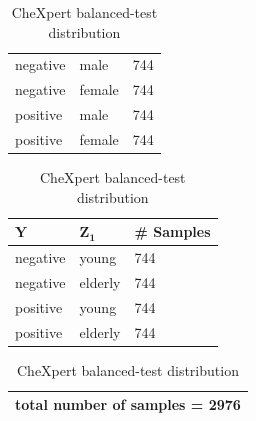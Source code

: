 \documentclass[12pt,DIV14,BCOR12mm,a4paper,footinclude=false,headinclude,parskip=half-,twoside,openright,cleardoublepage=empty,toc=index,bibliography=totoc,listof=totoc]{scrreprt}
\numberwithin{equation}{chapter}
\begin{document}
\begin{table}[H]
\begin{minipage}[H]{\linewidth}
\begin{minipage}[H]{0.5\linewidth}
\begin{tabular}{|p{1.25cm}|p{1.75cm}|p{2cm}|}
                \hline
                negative & male & 744 \\
                negative & female & 744\\
                positive & male & 744 \\
                positive & female & 744\\
                \hline
            \end{tabular}
            \begin{tabular}{|p{1.25cm}|p{1.75cm}|p{2cm}|}
                \hline
                $\mathbf{Y}$ & $\mathbf{Z_1}$ & \# \textbf{Samples } \\
                \hline
                negative & young & 744\\
                negative & elderly & 744\\
                positive & young & 744 \\
                positive & elderly & 744\\
                \hline
            \end{tabular}
            \begin{tabular}{|p{5.88cm}|}
                 \hline
                 total number of samples = 2976\\
                 \hline
            \end{tabular}
        \end{minipage}%
        \caption{CheXpert balanced-test distribution} 
        \label{tab:balanced-testChX}
    \end{minipage}%
\end{table}
\end{document}

